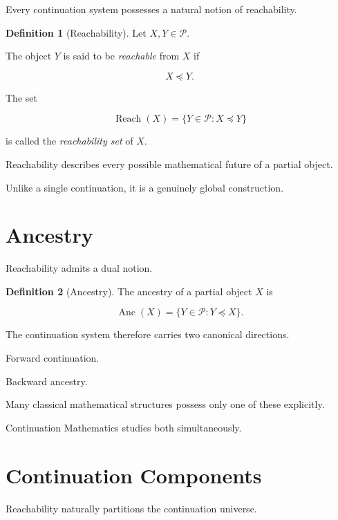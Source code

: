 \documentclass[13pt,openany]{book}
\theoremstyle{plain}
\theoremstyle{definition}
\newtheorem{definition}{Definition}[chapter]
\begin{document}
Every continuation system possesses a natural notion of reachability.

\begin{definition}[Reachability]
Let \(X,Y\in\mathcal P\).

The object \(Y\) is said to be
\emph{reachable}
from \(X\) if

\[
X\preceq Y.
\]

The set

\[
\operatorname{Reach}(X)
=
\{Y\in\mathcal P:X\preceq Y\}
\]

is called the
\emph{reachability set}
of \(X\).
\end{definition}

Reachability describes every possible mathematical future of a partial
object.

Unlike a single continuation, it is a genuinely global construction.

\section{Ancestry}

Reachability admits a dual notion.

\begin{definition}[Ancestry]
The ancestry of a partial object \(X\) is

\[
\operatorname{Anc}(X)
=
\{Y\in\mathcal P:Y\preceq X\}.
\]
\end{definition}

The continuation system therefore carries two canonical directions.

Forward continuation.

Backward ancestry.

Many classical mathematical structures possess only one of these
explicitly.

Continuation Mathematics studies both simultaneously.

\section{Continuation Components}

Reachability naturally partitions the continuation universe.
\end{document}
